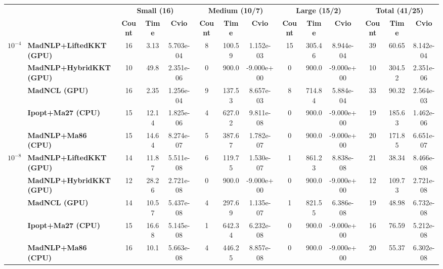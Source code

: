 \begin{center}
\renewcommand{\arraystretch}{0.9}
\begin{tabular}{|l|l|ccc|ccc|ccc|ccc|}
\hline
 & & \multicolumn{3}{c|}{\textbf{Small (16)}} & \multicolumn{3}{c|}{\textbf{Medium (10/7)}} & \multicolumn{3}{c|}{\textbf{Large (15/2)}} & \multicolumn{3}{c|}{\textbf{Total (41/25)}} \\
 & & \textbf{Count} & \textbf{Time} & \textbf{Cvio} & \textbf{Count} & \textbf{Time} & \textbf{Cvio} & \textbf{Count} & \textbf{Time} & \textbf{Cvio} & \textbf{Count} & \textbf{Time} & \textbf{Cvio}\\
\hline
\multirow{5}{*}{\Large\textbf{$10^{-4}$}} & \textbf{MadNLP+LiftedKKT (GPU)} & \cellcolor{blue!15}16 & 3.13 & 5.703e-04 & 8 & \cellcolor{blue!15}100.59 & 1.152e-03 & \cellcolor{blue!15}15 & \cellcolor{blue!15}305.46 & 8.944e-04 & \cellcolor{blue!15}39 & \cellcolor{blue!15}60.65 & 8.142e-04 \\
 & \textbf{MadNLP+HybridKKT (GPU)} & 10 & 49.8 & 2.351e-06 & 0 & 900.0 & \cellcolor{blue!15}-9.000e+00 & 0 & 900.0 & \cellcolor{blue!15}-9.000e+00 & 10 & 304.52 & 2.351e-06 \\
 & \textbf{MadNCL (GPU)} & \cellcolor{blue!15}16 & \cellcolor{blue!15}2.35 & 1.256e-04 & \cellcolor{blue!15}9 & 137.53 & 8.657e-03 & 8 & 714.84 & 5.884e-04 & 33 & 90.32 & 2.564e-03 \\
 & \textbf{Ipopt+Ma27 (CPU)} & 15 & 12.14 & 1.825e-06 & 4 & 627.02 & 9.811e-08 & 0 & 900.0 & \cellcolor{blue!15}-9.000e+00 & 19 & 185.63 & 1.462e-06 \\
 & \textbf{MadNLP+Ma86 (CPU)} & 15 & 14.64 & \cellcolor{blue!15}8.274e-07 & 5 & 387.67 & 1.782e-07 & 0 & 900.0 & \cellcolor{blue!15}-9.000e+00 & 20 & 171.85 & \cellcolor{blue!15}6.651e-07 \\
\hline
\multirow{5}{*}{\Large\textbf{$10^{-8}$}} & \textbf{MadNLP+LiftedKKT (GPU)} & 14 & 11.87 & 5.511e-08 & \cellcolor{blue!15}6 & \cellcolor{blue!15}119.75 & 1.530e-07 & \cellcolor{blue!15}1 & 861.23 & 8.838e-08 & \cellcolor{blue!15}21 & \cellcolor{blue!15}38.34 & 8.466e-08 \\
 & \textbf{MadNLP+HybridKKT (GPU)} & 12 & 28.26 & \cellcolor{blue!15}2.721e-08 & 0 & 900.0 & \cellcolor{blue!15}-9.000e+00 & 0 & 900.0 & \cellcolor{blue!15}-9.000e+00 & 12 & 109.73 & \cellcolor{blue!15}2.721e-08 \\
 & \textbf{MadNCL (GPU)} & 14 & 10.57 & 5.437e-08 & 4 & 297.69 & 1.135e-07 & \cellcolor{blue!15}1 & \cellcolor{blue!15}821.55 & 6.386e-08 & 19 & 48.98 & 6.732e-08 \\
 & \textbf{Ipopt+Ma27 (CPU)} & 15 & 16.68 & 5.145e-08 & 1 & 642.34 & 6.232e-08 & 0 & 900.0 & \cellcolor{blue!15}-9.000e+00 & 16 & 76.59 & 5.212e-08 \\
 & \textbf{MadNLP+Ma86 (CPU)} & \cellcolor{blue!15}16 & \cellcolor{blue!15}10.1 & 5.663e-08 & 4 & 446.25 & 8.857e-08 & 0 & 900.0 & \cellcolor{blue!15}-9.000e+00 & 20 & 55.37 & 6.302e-08 \\
\hline
\end{tabular}
\end{center}
